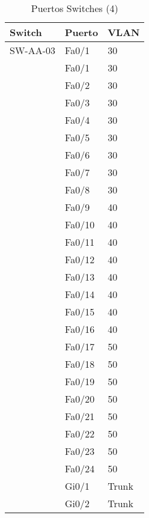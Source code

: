 \documentclass[a4paper,onecolumn,11pt]{article}
\begin{document}
\begin{table}[htbp]
\small \sffamily
\caption{Puertos Switches (4)}
\begin{center}
\begin{tabular}{p{}p{}p{}}
\toprule
\textbf{Switch} & \textbf{Puerto} & \textbf{VLAN}  \\
\toprule
SW-AA-03 & Fa0/1 & 30 \\ %
& Fa0/1 & 30\\
& Fa0/2 & 30\\
& Fa0/3 & 30\\
& Fa0/4 & 30\\
& Fa0/5 & 30\\
& Fa0/6 & 30\\
& Fa0/7 & 30\\
& Fa0/8 & 30\\
& Fa0/9 & 40\\
& Fa0/10 & 40\\
& Fa0/11 & 40\\
& Fa0/12 & 40\\
& Fa0/13 & 40\\
& Fa0/14 & 40\\
& Fa0/15 & 40\\
& Fa0/16 & 40\\
& Fa0/17 & 50\\
& Fa0/18 & 50\\
& Fa0/19 & 50\\
& Fa0/20 & 50\\
& Fa0/21 & 50\\
& Fa0/22 & 50\\
& Fa0/23 & 50\\
& Fa0/24 & 50\\
& Gi0/1 & Trunk  \\
& Gi0/2 & Trunk  \\ 
\bottomrule
\end{tabular}
\end{center}
\label{tab:puertos4}
\end{table}
\end{document}
